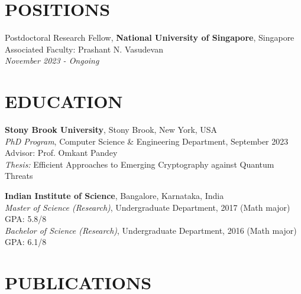 \documentclass[margin]{res}
\begin{document}
\begin{resume}

\section{POSITIONS}

Postdoctoral Research Fellow, \textbf{National University of Singapore}, Singapore
\\ Associated Faculty: Prashant N. Vasudevan \\\textit{November 2023 - Ongoing} 



\section{EDUCATION}

\textbf{Stony Brook University}, Stony Brook, New York, USA\\
{\sl PhD Program}, Computer Science \& Engineering Department, September 2023 \\ Advisor: Prof. Omkant Pandey \\ \textit{Thesis:} Eﬃcient Approaches to Emerging Cryptography
against Quantum Threats

\textbf{Indian Institute of Science}, Bangalore, Karnataka, India\\
{\sl Master of Science (Research)}, Undergraduate Department, 2017 (Math major)\hfill \newline
GPA: 5.8/8 \\
{\sl Bachelor of Science (Research)}, Undergraduate Department, 2016 (Math major)\hfill \newline
GPA: 6.1/8




\section{PUBLICATIONS}


\end{resume}
\end{document}
